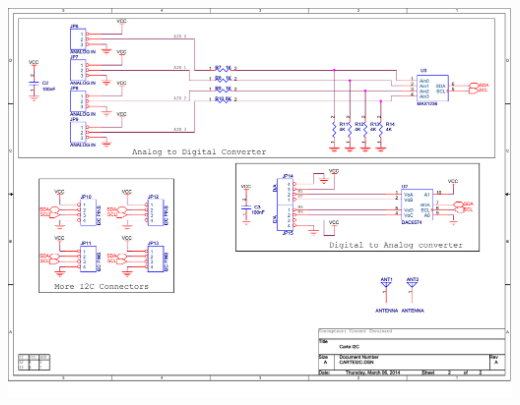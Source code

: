 \begin{multicols}{4}
\includegraphics[scale=0.2,angle=90]{Figures/OrCad/ExtensionI2C2.pdf}


\end{multicols}
\vfill
\pagebreak



